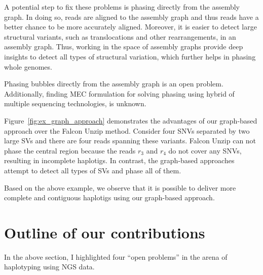 A potential step to fix these problems is phasing directly from the assembly graph. 
In doing so, reads are aligned to the assembly graph and thus reads have a better chance to be more accurately aligned.
Moreover, it is easier to detect large structural variants, such as translocations and other rearrangements, in an assembly graph.
Thus, working in the space of assembly graphs provide deep insights to detect all types of structural variation, which further helps in phasing whole genomes.
\begin{gaps}
 Phasing bubbles directly from the assembly graph is an open problem. Additionally, finding MEC formulation for solving phasing using hybrid of multiple sequencing technologies, is unknown. 
 \label{gap:gap4}
\end{gaps}

\begin{example}
Figure~\ref{fig:ex_graph_approach} demonstrates the advantages of our graph-based approach over the Falcon Unzip method.
Consider four SNVs separated by two large SVs and there are four reads spanning these variants.
Falcon Unzip can not phase the central region because the reads $r_3$ and $r_4$ do not cover any SNVs, resulting in incomplete haplotigs.
In contrast, the graph-based approaches attempt to detect all types of SVs and phase all of them.
\end{example}
Based on the above example, we observe that it is possible to deliver more complete and contiguous haplotigs using our graph-based approach.

\section{Outline of our contributions}
In the above section, I highlighted four ``open problems'' in the arena of haplotyping using NGS data.

